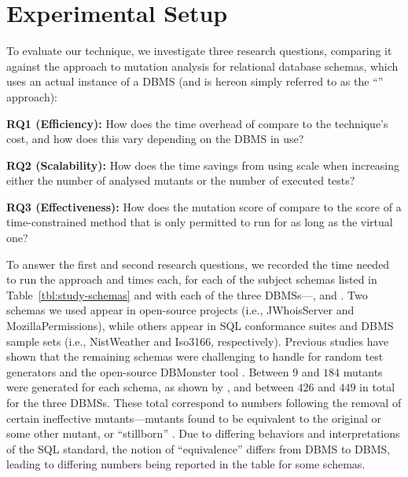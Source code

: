 
\vspace{-1em}
\section{Experimental Setup}
\label{sec:experimental-setup}



To evaluate our \vma technique, we investigate three research questions, comparing it against the \Original approach to mutation analysis for relational database schemas, which uses an actual instance of a DBMS (and is hereon simply referred to as the ``\Original'' approach):

\vspace{5pt}

\noindent
\textbf{RQ1 (Efficiency):} How does the time overhead of \vma compare to the \Standard technique's cost, and how does
this vary depending on the DBMS in use?

\vspace{5pt}

\noindent
\textbf{RQ2 (Scalability):} How does the time savings from using \vma scale when increasing either the number
of analysed mutants or the number of executed tests?

\vspace{5pt}

\noindent
\textbf{RQ3 (Effectiveness):} How does the mutation score of \vma compare to the score of a time-constrained method that
is only permitted to run for as long as the virtual one?


\begin{sloppypar}
 To answer the first and second research \mbox{questions}, we recorded the time needed to run the \Original approach and  times each, for each of the subject schemas listed in Table~\ref{tbl:study-schemas} and with each of the three DBMSs---\HyperSQL, \Postgres and \SQLite.  Two schemas we used appear in open-source projects (i.e., JWhoisServer and MozillaPermissions), while others appear in SQL conformance suites and DBMS sample sets (i.e., NistWeather and Iso3166, respectively). Previous studies have shown that the remaining schemas were challenging to handle for random test generators \cite{McMinn2015} and the open-source DBMonster tool \cite{Kapfhammer2013}.  Between $9$ and $184$ mutants were generated for each schema, as shown by , and between $426$ and $449$ in total for the three DBMSs. These total correspond to numbers following the removal of certain ineffective mutants---mutants found to be equivalent to the original or some other mutant, or ``stillborn'' \cite{Wright2014}. Due to differing behaviors and interpretations of the SQL standard, the notion of ``equivalence'' differs from DBMS to DBMS, leading to differing numbers being reported in the table for some schemas.
\end{sloppypar}

